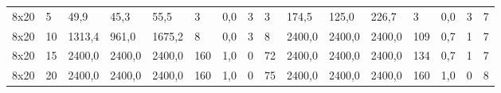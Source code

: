 \begin{table}[]
\begin{tabular}{llllllllllllllll}
		8x20    & 5      & 49,9                                                & 45,3                                                & 55,5                                                & 3                                                   & 0,0                                                 & 3      & 3                                                         & 174,5                                               & 125,0                                               & 226,7                                               & 3                                                   & 0,0                                                 & 3      & 7                                                         \\
		8x20    & 10     & 1313,4                                              & 961,0                                               & 1675,2                                              & 8                                                   & 0,0                                                 & 3      & 8                                                         & 2400,0                                              & 2400,0                                              & 2400,0                                              & 109                                                 & 0,7                                                 & 1      & 7                                                         \\
		8x20    & 15     & 2400,0                                              & 2400,0                                              & 2400,0                                              & 160                                                 & 1,0                                                 & 0      & 72                                                        & 2400,0                                              & 2400,0                                              & 2400,0                                              & 134                                                 & 0,7                                                 & 1      & 7                                                         \\
		8x20    & 20     & 2400,0                                              & 2400,0                                              & 2400,0                                              & 160                                                 & 1,0                                                 & 0      & 75                                                        & 2400,0                                              & 2400,0                                              & 2400,0                                              & 160                                                 & 1,0                                                 & 0      & 8                                                         \\

\end{tabular}
\end{table}

